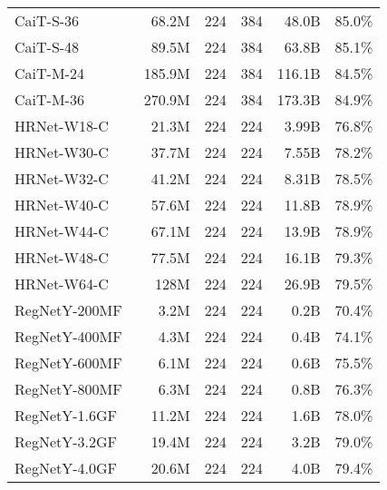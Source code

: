 \documentclass{article}
\begin{document}
\begin{table*}
{\begin{tabular}{lrrrrr}
        CaiT-S-36~\cite{touvron2021going}                 &  68.2M &       224 & 384 & 48.0B & 85.0\%  \\
        CaiT-S-48~\cite{touvron2021going}                 &  89.5M &       224 & 384 & 63.8B & 85.1\%  \\
        CaiT-M-24~\cite{touvron2021going}                 & 185.9M &       224 & 384 &116.1B & 84.5\%  \\
        CaiT-M-36~\cite{touvron2021going}                 & 270.9M &       224 & 384 &173.3B & 84.9\%  \\ \midrule
        HRNet-W18-C~\cite{sun2019hrnet_pose}              &  21.3M &       224 & 224 & 3.99B & 76.8\%  \\
        HRNet-W30-C~\cite{sun2019hrnet_pose}              &  37.7M &       224 & 224 & 7.55B & 78.2\%  \\
        HRNet-W32-C~\cite{sun2019hrnet_pose}              &  41.2M &       224 & 224 & 8.31B & 78.5\%  \\
        HRNet-W40-C~\cite{sun2019hrnet_pose}              &  57.6M &       224 & 224 & 11.8B & 78.9\%  \\
        HRNet-W44-C~\cite{sun2019hrnet_pose}              &  67.1M &       224 & 224 & 13.9B & 78.9\%  \\
        HRNet-W48-C~\cite{sun2019hrnet_pose}              &  77.5M &       224 & 224 & 16.1B & 79.3\%  \\
        HRNet-W64-C~\cite{sun2019hrnet_pose}              &   128M &       224 & 224 & 26.9B & 79.5\%  \\ \midrule
        RegNetY-200MF~\cite{radosavovic2020designing}     &   3.2M &       224 & 224 &  0.2B & 70.4\%  \\
        RegNetY-400MF~\cite{radosavovic2020designing}     &   4.3M &       224 & 224 &  0.4B & 74.1\%  \\
        RegNetY-600MF~\cite{radosavovic2020designing}     &   6.1M &       224 & 224 &  0.6B & 75.5\%  \\
        RegNetY-800MF~\cite{radosavovic2020designing}     &   6.3M &       224 & 224 &  0.8B & 76.3\%  \\
        RegNetY-1.6GF~\cite{radosavovic2020designing}     &  11.2M &       224 & 224 &  1.6B & 78.0\%  \\
        RegNetY-3.2GF~\cite{radosavovic2020designing}     &  19.4M &       224 & 224 &  3.2B & 79.0\%  \\
        RegNetY-4.0GF~\cite{radosavovic2020designing}     &  20.6M &       224 & 224 &  4.0B & 79.4\%  \\

\end{tabular}}
\end{table*}
\end{document}
